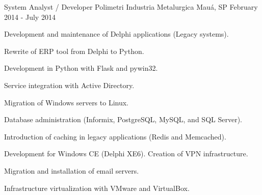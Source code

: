 \begin{cventries}
\cventry
{System Analyst / Developer} %
{Polimetri Industria Metalurgica} %
{Mauá, SP} %
{February 2014 - July 2014} %
{
  \begin{cvitems} %
      \item {Development and maintenance of Delphi applications (Legacy systems).}
      \item {Rewrite of ERP tool from Delphi to Python.}
      \item {Development in Python with Flask and pywin32.}
      \item {Service integration with Active Directory.}
      \item {Migration of Windows servers to Linux.}
      \item {Database administration (Informix, PostgreSQL, MySQL, and SQL Server).}
      \item {Introduction of caching in legacy applications (Redis and Memcached).}
      \item {Development for Windows CE (Delphi XE6). Creation of VPN infrastructure.}
      \item {Migration and installation of email servers.}
      \item {Infrastructure virtualization with VMware and VirtualBox.}
  \end{cvitems}
}


\end{cventries}
